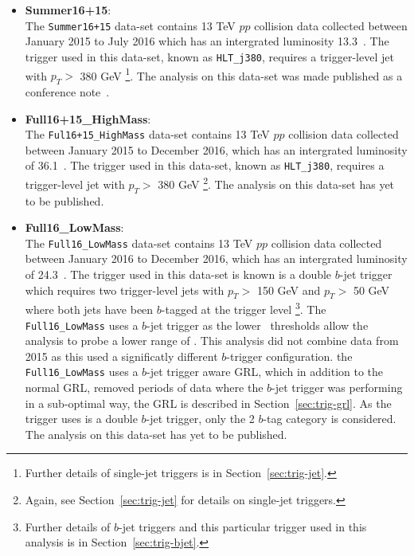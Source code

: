 \begin{itemize}[leftmargin=*]
\item\textbf{Summer16+15}: \\
  The \verb|Summer16+15| data-set contains 13 TeV $pp$ collision data collected
  between January 2015 to July 2016 which has an intergrated luminosity 13.3~\ifb.
  The trigger used in this data-set, known as \verb|HLT_j380|,
  requires a trigger-level jet with $p_T >$ 380 GeV
  \footnote{\label{foot1} Further details of single-jet triggers is in Section~\ref{sec:trig-jet}.}.
  The analysis on this data-set was made published as a conference note~\cite{dibjet-ichep_conf}. \\
  
\item\textbf{Full16+15\_HighMass}:\\
  The \verb|Ful16+15_HighMass| data-set contains 13 TeV $pp$ collision data collected
  between January 2015 to December 2016, which has an intergrated luminosity of 36.1~\ifb.
  The trigger used in this data-set, known as \verb|HLT_j380|,
  requires a trigger-level jet with $p_T >$ 380 GeV
  \footnote{Again, see  Section~\ref{sec:trig-jet} for details on single-jet triggers.}.
  The analysis on this data-set has yet to be published.\\
  
\item\textbf{Full16\_LowMass}: \\
  The \verb|Full16_LowMass| data-set contains 13 TeV $pp$ collision data collected
  between January 2016 to December 2016, which has an intergrated luminosity of 24.3~\ifb.
  The trigger used in this data-set is known is a double $b$-jet trigger 
  which requires two trigger-level jets with $p_T >$ 150 GeV and $p_T >$ 50 GeV
  where both jets have been $b$-tagged at the trigger level
  \footnote{Further details of $b$-jet triggers and this particular trigger used in this analysis is in Section~\ref{sec:trig-bjet}.}.
  The \verb|Full16_LowMass| uses a $b$-jet trigger as the lower \pT~thresholds allow
  the analysis to probe a lower range of \mjj.
  This analysis did not combine data from 2015 as this used a significatly different $b$-trigger configuration.
  the \verb|Full16_LowMass| uses a $b$-jet trigger aware GRL, which in addition to the normal GRL,
  removed periods of data where the $b$-jet trigger was performing in a sub-optimal way,
  the GRL is described in Section~\ref{sec:trig-grl}.
  As the trigger uses is a double $b$-jet trigger, only the 2 $b$-tag category is considered.
  The analysis on this data-set has yet to be published.

\end{itemize}

